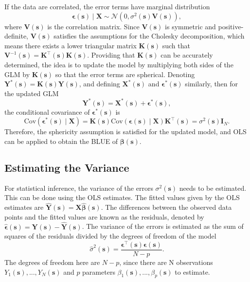 If the data are correlated, the error terms have marginal distribution 
\begin{equation}
\label{eq:correlated_errors}
\bm{\epsilon}(\bm{s}) \mid \bm{X} \sim  \mathcal{N}(0, \sigma^{2}(\bm{s})\bm{V}(\bm{s})),
\end{equation}
where $\bm{V}(\bm{s})$ is the correlation matrix. Since $\bm{V}(\bm{s})$ is symmetric and positive-definite, $\bm{V}(\bm{s})$ satisfies the assumptions for the Cholesky decomposition, which means there exists a lower triangular matrix $\bm{K}(\bm{s})$ such that $\bm{V}^{-1}(\bm{s}) = \bm{K}^{\intercal}(\bm{s})\bm{K}(\bm{s})$. Providing that $\bm{K}(\bm{s})$ can be accurately determined, the idea is to update the model by multiplying both sides of the GLM by $\bm{K}(\bm{s})$ so that the error terms are spherical. Denoting $\bm{Y}^{*}(\bm{s}) = \bm{K}(\bm{s})\bm{Y}(\bm{s})$, and defining $\bm{X}^{*}(\bm{s})$ and $\bm{\epsilon}^{*}(\bm{s})$ similarly, then for the updated GLM
\begin{equation}
\label{eq:updated_GLM}
\bm{Y}^{*}(\bm{s}) = \bm{X}^{*}(\bm{s}) + \bm{\epsilon}^{*}(\bm{s}),
\end{equation}
the conditional covariance of $\bm{\epsilon}^{*}(\bm{s})$ is
\begin{equation}
\label{eq:updated_error_cov}
\mathrm{Cov}(\bm{\epsilon}^{*}(\bm{s}) \mid \bm{X}) = \bm{K}(\bm{s})\mathrm{Cov}(\bm{\epsilon}(\bm{s}) \mid \bm{X})\bm{K}^{\intercal}(\bm{s}) = \sigma^{2}(\bm{s})\bm{I}_{N}.
\end{equation}
Therefore, the sphericity assumption is satisfied for the updated model, and OLS can be applied to obtain the BLUE of $\bm{\beta}(\bm{s})$.

\subsection{Estimating the Variance}
For statistical inference, the variance of the errors $\sigma^{2}(\bm{s})$ needs to be estimated. This can be done using the OLS estimates. The fitted values given by the OLS estimates are $\hat{\bm{Y}}(\bm{s}) = \bm{X}\hat{\bm{\beta}}(\bm{s})$. The differences between the observed data points and the fitted values are known as the residuals, denoted by $\hat{\bm{\epsilon}}(\bm{s}) = \bm{Y}(\bm{s}) - \hat{\bm{Y}}(\bm{s})$. The variance of the errors is estimated as the sum of squares of the residuals divided by the degrees of freedom of the model
\begin{equation}
\label{eq:variance_estimator}
\hat{\sigma}^{2}(\bm{s}) = \frac{\bm{\epsilon^{\intercal}}(\bm{s})\bm{\epsilon}(\bm{s})}{N - p}.
\end{equation}
The degrees of freedom here are $N - p$, since there are N observations $Y_{1}(\bm{s}), ..., Y_{N}(\bm{s})$ and $p$ parameters $\beta_{1}(\bm{s}), ... , \beta_{p}(\bm{s})$ to estimate.

